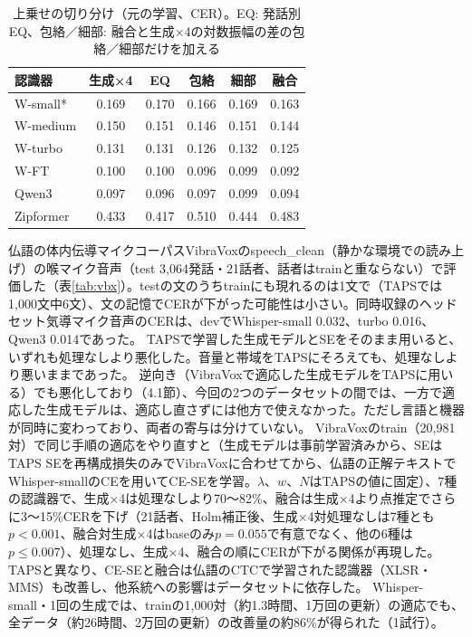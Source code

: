 \documentclass[xelatex,ja=standard,a4paper,twocolumn,10pt]{bxjsarticle}
\makeatletter
\renewcommand{\subsection}{\@startsection{subsection}{2}{\z@}{.7ex plus .2ex}{.3ex}{\normalfont\normalsize\sffamily\bfseries}}
\makeatother
\begin{document}
\begin{table}[t]
  \centering
  \caption{上乗せの切り分け（元の学習、CER）。EQ: 発話別EQ、包絡／細部: 融合と生成×4の対数振幅の差の包絡／細部だけを加える}
  \label{tab:why}
  \footnotesize
  \setlength{\tabcolsep}{3.0pt}
  \begin{tabular}{lccccc}
    \toprule
    認識器 & 生成×4 & EQ & 包絡 & 細部 & 融合 \\
    \midrule
    W-small* & 0.169 & 0.170 & 0.166 & 0.169 & 0.163 \\
    W-medium & 0.150 & 0.151 & 0.146 & 0.151 & 0.144 \\
    W-turbo & 0.131 & 0.131 & 0.126 & 0.132 & 0.125 \\
    W-FT & 0.100 & 0.100 & 0.096 & 0.099 & 0.092 \\
    Qwen3 & 0.097 & 0.096 & 0.097 & 0.099 & 0.094 \\
    \midrule
    Zipformer & 0.433 & 0.417 & 0.510 & 0.444 & 0.483 \\
    \bottomrule
  \end{tabular}
\end{table}

\subsection{別の喉マイクでの評価}
仏語の体内伝導マイクコーパスVibraVox\cite{vibravox}のspeech\_clean（静かな環境での読み上げ）の喉マイク音声（test 3,064発話・21話者、話者はtrainと重ならない）で評価した（表\ref{tab:vbx}）。testの文のうちtrainにも現れるのは1文で（TAPSでは1,000文中6文）、文の記憶でCERが下がった可能性は小さい。同時収録のヘッドセット気導マイク音声のCERは、devでWhisper-small 0.032、turbo 0.016、Qwen3 0.014であった。
TAPSで学習した生成モデルとSEをそのまま用いると、いずれも処理なしより悪化した。音量と帯域をTAPSにそろえても、処理なしより悪いままであった。
逆向き（VibraVoxで適応した生成モデルをTAPSに用いる）でも悪化しており（4.1節）、今回の2つのデータセットの間では、一方で適応した生成モデルは、適応し直さずには他方で使えなかった。ただし言語と機器が同時に変わっており、両者の寄与は分けていない。
VibraVoxのtrain（20,981対）で同じ手順の適応をやり直すと（生成モデルは事前学習済みから、SEはTAPS SEを再構成損失のみでVibraVoxに合わせてから、仏語の正解テキストでWhisper-smallのCEを用いてCE-SEを学習。$\lambda$、$w$、$N$はTAPSの値に固定）、7種の認識器で、生成×4は処理なしより70〜82\%、融合は生成×4より点推定でさらに3〜15\%CERを下げ（21話者、Holm補正後、生成×4対処理なしは7種とも$p<0.001$、融合対生成×4はbaseのみ$p=0.055$で有意でなく、他の6種は$p\le0.007$）、処理なし、生成×4、融合の順にCERが下がる関係が再現した。
TAPSと異なり、CE-SEと融合は仏語のCTCで学習された認識器（XLSR・MMS）も改善し、他系統への影響はデータセットに依存した。
Whisper-small・1回の生成では、trainの1,000対（約1.3時間、1万回の更新）の適応でも、全データ（約26時間、2万回の更新）の改善量の約86\%が得られた（1試行）。
\end{document}
